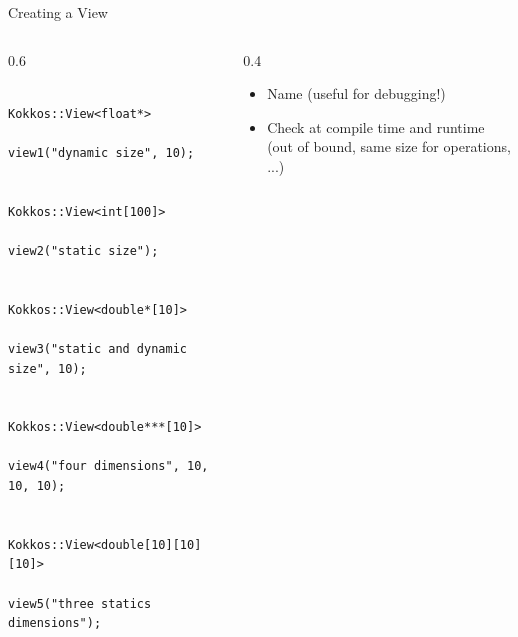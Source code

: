 \documentclass[
    aspectratio=169,
    \createHandout
]{beamer}
\begin{document}
\begin{frame}[fragile]{Creating a View}
    \begin{columns}
        \begin{column}{0.6\linewidth}
            \begin{verbatim}
                Kokkos::View<float*>
                    view1("dynamic size", 10);

                Kokkos::View<int[100]>
                    view2("static size");

                Kokkos::View<double*[10]>
                    view3("static and dynamic size", 10);

                Kokkos::View<double***[10]>
                    view4("four dimensions", 10, 10, 10);

                Kokkos::View<double[10][10][10]>
                    view5("three statics dimensions");
            \end{verbatim}
        \end{column}
        \begin{column}{0.4\linewidth}
            \begin{itemize}
                \item Name (useful for debugging!)
                \item Check at compile time and runtime (out of bound, same size for operations, ...)
            \end{itemize}
        \end{column}
    \end{columns}
\end{frame}

\end{document}
